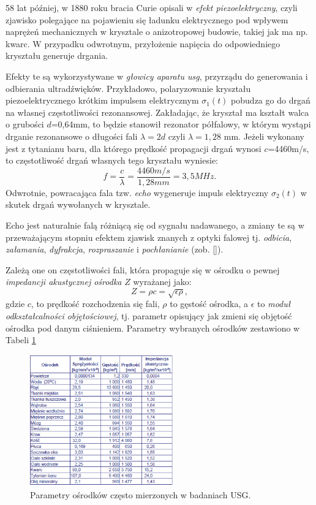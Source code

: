 58 lat później, w 1880 roku bracia Curie opisali w \cite{Curie1880} \textit{efekt piezoelektryczny}, czyli zjawisko polegające na pojawieniu się ładunku elektrycznego pod wpływem naprężeń mechanicznych w krysztale o anizotropowej budowie, takiej jak ma np. kwarc. W przypadku odwrotnym, przyłożenie napięcia do odpowiedniego kryształu generuje drgania. 

Efekty te są wykorzystywane w \textit{głowicy aparatu usg}, przyrządu do generowania i odbierania ultradźwięków. Przykładowo, polaryzowanie kryształu piezoelektrycznego krótkim impulsem elektrycznym $\sigma_1(t)$ pobudza go do drgań na własnej częstotliwości rezonansowej. Zakładając, że kryształ ma kształt walca o grubości $d$=0,64mm, to będzie stanowił rezonator półfalowy, w którym wystąpi drganie rezonansowe o długości fali $\lambda = 2d$ czyli $\lambda = 1,28$ mm. Jeżeli wykonany jest z tytanianu baru, dla którego prędkość propagacji drgań wynosi $c$=4460m/s, to częstotliwość drgań własnych tego
kryształu wyniesie:
\begin{equation}
f = \frac{c}{\lambda} = \frac{4460 m/s}{1,28 mm} = 3,5 MHz.
\end{equation}
Odwrotnie, powracająca fala tzw. \textit{echo} wygeneruje impuls elektryczny $\sigma_2(t)$ w skutek drgań wywołanych w krysztale. 
 
Echo jest naturalnie falą różniącą się od sygnału nadawanego, a zmiany te są w przeważającym stopniu efektem zjawisk znanych z optyki falowej tj. \textit{odbicia}, \textit{załamania}, \textit{dyfrakcja}, \textit{rozpraszanie} i \textit{pochłanianie} (zob. []).

Zależą one on częstotliwości fali, która propaguje się w ośrodku o pewnej \textit{impedancji akustycznej ośrodka} $Z$ wyrażanej jako:
\begin{equation}
Z = \rho c = \sqrt{\epsilon \rho},
\end{equation}
gdzie $c$, to prędkość rozchodzenia się fali, $\rho$ to gęstość ośrodka, a $\epsilon$ to \textit{moduł odkształcalności objętościowej}, tj. parametr opisujący jak zmieni się objętość ośrodka pod danym ciśnieniem. Parametry wybranych ośrodków zestawiono w Tabeli \ref{USG-params} 
\begin{figure}[h!]
	\centering
	\includegraphics[width=0.55\textwidth]{figures/USG-params.png}
	\caption{Parametry ośrodków często mierzonych w badaniach USG.}
	\label{USG-params}
\end{figure}

